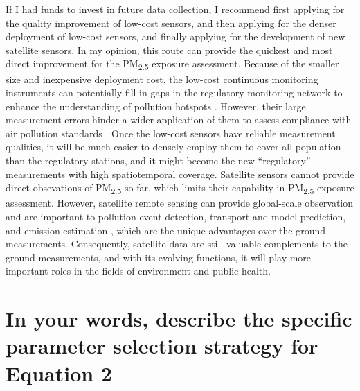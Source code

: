 \documentclass[11pt]{article}
\newcommand{\tsub}{\textsubscript}
\begin{document}
\begin{enumerate*}[{[a)]}]
    \item If I had funds to invest in future data collection, I recommend first applying for the quality improvement of low-cost sensors, and then applying for the denser deployment of low-cost sensors, and finally applying for the development of new satellite sensors. In my opinion, this route can provide the quickest and most direct improvement for the PM\tsub{2.5} exposure assessment. Because of the smaller size and inexpensive deployment cost, the low-cost continuous monitoring instruments can potentially fill in gaps in the regulatory monitoring network to enhance the understanding of pollution hotspots \citep{gao2015distributed}. However, their large measurement errors hinder a wider application of them to assess compliance with air pollution standards \citep{hall2014integrating}. Once the low-cost sensors have reliable measurement qualities, it will be much easier to densely employ them to cover all population than the regulatory stations, and it might become the new ``regulatory'' measurements with high spatiotemporal coverage. Satellite sensors cannot provide direct obsevations of PM\tsub{2.5} so far, which limits their capability in PM\tsub{2.5} exposure assessment. However, satellite remote sensing can provide global-scale observation and are important to pollution event detection, transport and model prediction, and emission estimation \citep{hoff2009remote}, which are the unique advantages over the ground measurements. Consequently, satellite data are still valuable complements to the ground measurements, and with its evolving functions, it will play more important roles in the fields of environment and public health. 
\end{enumerate*}

\section{In your words, describe the specific parameter selection strategy for Equation 2}

\hdashrule{\textwidth}{0.1pt}{3mm 3pt 1mm 3pt}
\setcounter{section}{0}
\end{document}
